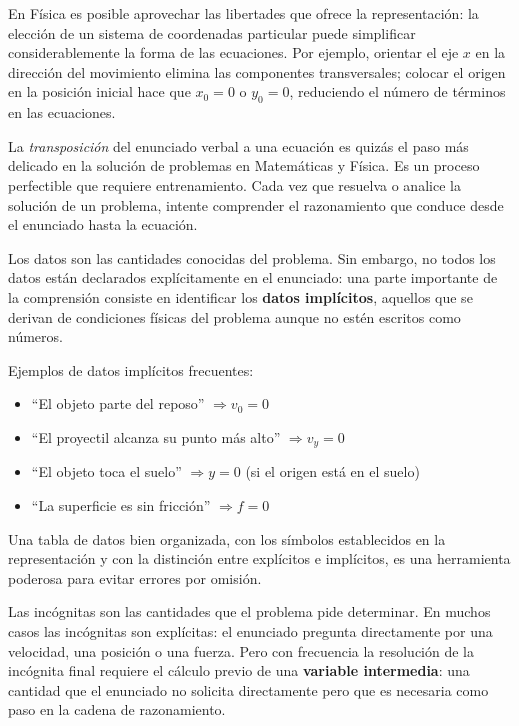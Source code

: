 \documentclass[11pt]{book}
\begin{document}
\begin{enumerate}
En Física es posible aprovechar las libertades que ofrece la representación: la elección de un sistema de coordenadas particular puede simplificar considerablemente la forma de las ecuaciones. Por ejemplo, orientar el eje $x$ en la dirección del movimiento elimina las componentes transversales; colocar el origen en la posición inicial hace que $x_0 = 0$ o $y_0 = 0$, reduciendo el número de términos en las ecuaciones.

La {\it transposición} del enunciado verbal a una ecuación es quizás el paso más delicado en la solución de problemas en Matemáticas y Física. Es un proceso perfectible que requiere entrenamiento. Cada vez que resuelva o analice la solución de un problema, intente comprender el razonamiento que conduce desde el enunciado hasta la ecuación.

\medskip
{}
\medskip

Los datos son las cantidades conocidas del problema. Sin embargo, no todos los datos están declarados explícitamente en el enunciado: una parte importante de la comprensión consiste en identificar los {\bf datos implícitos}, aquellos que se derivan de condiciones físicas del problema aunque no estén escritos como números.

Ejemplos de datos implícitos frecuentes:
\begin{itemize}
    \item ``El objeto parte del reposo'' $\Rightarrow v_0 = 0$
    \item ``El proyectil alcanza su punto más alto'' $\Rightarrow v_y = 0$
    \item ``El objeto toca el suelo'' $\Rightarrow y = 0$ (si el origen está en el suelo)
    \item ``La superficie es sin fricción'' $\Rightarrow f = 0$
\end{itemize}

Una tabla de datos bien organizada, con los símbolos establecidos en la representación y con la distinción entre explícitos e implícitos, es una herramienta poderosa para evitar errores por omisión.

\medskip
{}
\medskip

Las incógnitas son las cantidades que el problema pide determinar. En muchos casos las incógnitas son explícitas: el enunciado pregunta directamente por una velocidad, una posición o una fuerza. Pero con frecuencia la resolución de la incógnita final requiere el cálculo previo de una {\bf variable intermedia}: una cantidad que el enunciado no solicita directamente pero que es necesaria como paso en la cadena de razonamiento.


\end{enumerate}
\end{document}
